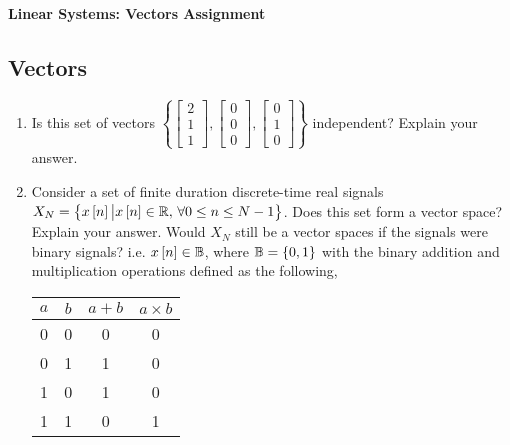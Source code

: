 \documentclass[9pt]{article}
\def\mb{\ensuremath\mathbb}
\def\lc{\ensuremath\left\{}
\def\rc{\ensuremath\right\}}
\def\ls{\ensuremath\left[}
\def\rs{\ensuremath\right]}
\newcommand{\dt}[1]{\ls #1\rs}
\begin{document}
\begin{center}
\begin{Large}
\textbf{Linear Systems: Vectors Assignment}
\end{Large}
\end{center}
\vspace{0.2cm}

\begin{multicols}{2}

  \subsection*{Vectors}
  \begin{enumerate}
      \item Is this set of vectors $\left\{\begin{bmatrix}2 \\ 1 \\ 1\end{bmatrix}, \begin{bmatrix}0 \\ 0\\ 0\end{bmatrix}, \begin{bmatrix}0 \\ 1 \\ 0\end{bmatrix}\right\}$ independent? Explain your answer.
  
      \item Consider a set of finite duration discrete-time real signals $X_N = \lc x\dt{n} \big\vert x\dt{n} \in \mb{R}, \,\forall 0 \leq n \leq N-1\rc$. Does this set form a vector space? Explain your answer. Would $X_N$ still be a vector spaces if the signals were binary signals? i.e. $x\dt{n} \in \mb{B}$, where $\mb{B} = \lc 0, 1\rc$ with the binary addition and multiplication operations defined as the following,
  
      \begin{minipage}[h]{.45\textwidth}
          \centering
          \begin{tabular}{|c|c|c|c|}
          \hline
          $a$ & $b$ & $a+b$ & $a \times b$ \\ \hline
          0 & 0 & 0   & 0     \\ \hline
          0 & 1 & 1   & 0     \\ \hline
          1 & 0 & 1   & 0     \\ \hline
          1 & 1 & 0   & 1     \\ \hline
          \end{tabular}\\
      \end{minipage}
  

\end{enumerate}
\end{multicols}
\end{document}
